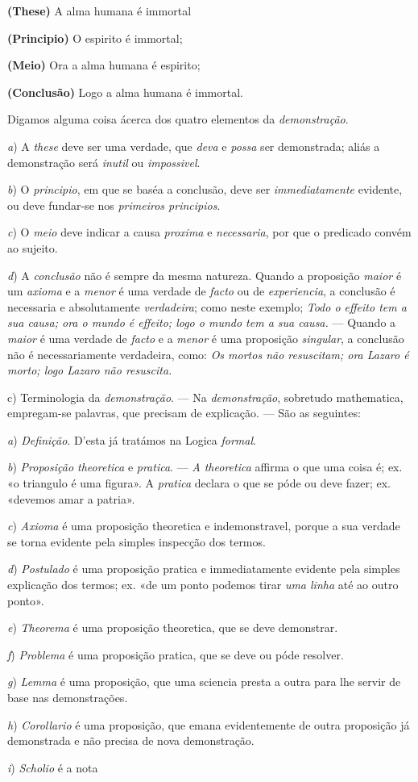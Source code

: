 \textbf{(These)} A alma humana é immortal\par \textbf{(Principio)} O espirito é immortal;\par \textbf{(Meio)} Ora a alma humana é espirito;\par \textbf{(Conclusão)} Logo a alma humana é immortal.\par Digamos alguma coisa ácerca dos quatro elementos da \emph{demonstração}.\par \emph{a}) A \emph{these} deve ser uma verdade, que \emph{deva} e \emph{possa} ser demonstrada; aliás a demonstração será \emph{inutil} ou \emph{impossivel}.\par \emph{b}) O \emph{principio}, em que se baséa a conclusão, deve ser \emph{immediatamente} evidente, ou deve fundar-se nos \emph{primeiros principios}.\par \emph{c}) O \emph{meio} deve indicar a causa \emph{proxima} e \emph{necessaria}, por que o predicado convém ao sujeito.\par \emph{d}) A \emph{conclusão} não é sempre da mesma natureza. Quando a proposição \emph{maior} é um \emph{axioma} e a \emph{menor} é uma verdade de \emph{facto} ou de \emph{experiencia}, a conclusão é necessaria e absolutamente \emph{verdadeira}; como neste exemplo; \emph{Todo o effeito tem a sua causa; ora o mundo é effeito; logo o mundo tem a sua causa.} --- Quando a \emph{maior} é uma verdade de \emph{facto} e a \emph{menor} é uma proposição \emph{singular}, a conclusão não é necessariamente verdadeira, como: \emph{Os mortos não resuscitam; ora Lazaro é morto; logo Lazaro não resuscita.}\par c) Terminologia da \emph{demonstração}. --- Na \emph{demonstração}, sobretudo mathematica, empregam-se palavras, que precisam de explicação. --- São as seguintes:\par \emph{a}) \emph{Definição}. D'esta já tratámos na Logica \emph{formal}.\par \emph{b}) \emph{Proposição theoretica} e \emph{pratica}. --- \emph{A theoretica} affirma o que uma coisa é; ex. «o triangulo é uma figura». A \emph{pratica} declara o que se póde ou deve fazer; ex. «devemos amar a patria».\par \emph{c}) \emph{Axioma} é uma proposição theoretica e indemonstravel, porque a sua verdade se torna evidente pela simples inspecção dos termos.\par \emph{d}) \emph{Postulado} é uma proposição pratica e immediatamente evidente pela simples explicação dos termos; ex. «de um ponto podemos tirar \emph{uma linha} até ao outro ponto».\par \emph{e}) \emph{Theorema} é uma proposição theoretica, que se deve demonstrar.\par \emph{f}) \emph{Problema} é uma proposição pratica, que se deve ou póde resolver.\par \emph{g}) \emph{Lemma} é uma proposição, que uma sciencia presta a outra para lhe servir de base nas demonstrações.\par \emph{h}) \emph{Corollario} é uma proposição, que emana evidentemente de outra proposição já demonstrada e não precisa de nova demonstração.\par \emph{i}) \emph{Scholio} é a nota 